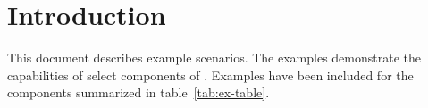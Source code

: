 \section*{Introduction}

This document describes \mf example scenarios. The examples demonstrate the capabilities of select components of \mf. Examples have been included for the \mf components summarized in table~\ref{tab:ex-table}.


